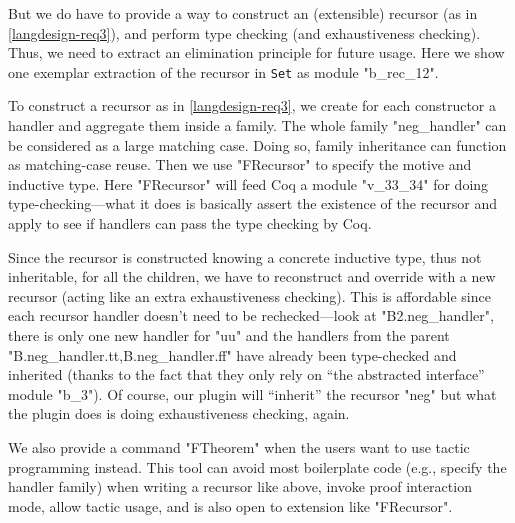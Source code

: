 But we do have to provide a way to construct an (extensible) recursor
(as in \ref{langdesign-req3}), and perform type checking (and
exhaustiveness checking). Thus, we need to extract an elimination
principle for future usage. Here we show one exemplar extraction of the
recursor in \texttt{Set} as module "b_rec_12".

To construct a recursor as in \ref{langdesign-req3}, we create for each
constructor a handler and aggregate them inside a family. The whole
family "neg_handler" can be considered as a large matching case. Doing
so, family inheritance can function as matching-case reuse. Then we use
"FRecursor" to specify the motive and inductive type. Here "FRecursor"
will feed Coq
a module "v_33_34" for doing type-checking---what it does is basically
assert the existence of the recursor and apply to see if handlers can
pass the type checking by Coq. 

Since the recursor is constructed knowing a concrete inductive type,
thus not inheritable, for all the children, we have to reconstruct and
override with a new recursor (acting like an extra exhaustiveness
checking). This is affordable since each recursor handler doesn't need
to be rechecked---look at "B2.neg_handler", there is only one new
handler for "uu" and the handlers from the parent
"B.neg_handler.tt,B.neg_handler.ff" have already been type-checked and
inherited (thanks to the fact that they only rely on ``the abstracted
interface'' module "b_3"). Of course, our plugin will ``inherit'' the
recursor "neg" but what the plugin does is doing exhaustiveness
checking, again.



We also provide a command "FTheorem" when the users want to use tactic
programming instead. This tool can avoid most boilerplate code (e.g.,
specify the handler family) when writing a recursor like above, invoke
proof interaction mode, allow tactic usage, and is also open to
extension like "FRecursor".

